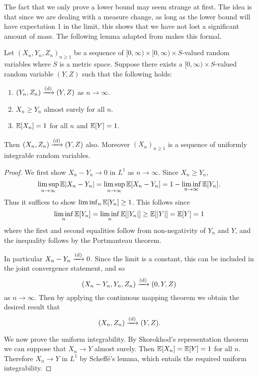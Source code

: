 The fact that we only prove a lower bound may seem strange at first. The idea is that since we are dealing with a measure change, as long as the lower bound will have expectation 1 in the limit, this shows that we have not lost a significant amount of mass. The following lemma adapted from \cite[Lemma 4.8]{conchon--kerjanStableGraphMetric2020} makes this formal.
\begin{lemma}
    \label{lem:sandwiching-lemma}
    Let $(X_n, Y_n, Z_n)_{n \geq 1}$ be a sequence of $[0, \infty) \times [0, \infty) \times S$-valued random variables where $S$ is a metric space. Suppose there exists a $[0, \infty) \times S$-valued random variable $(Y, Z)$ such that the following holds:
    \begin{enumerate}
        \item $(Y_n, Z_n) \xrightarrow[]{\mathrm{(d)}} (Y, Z)$ as $n \to \infty$.
        \item $X_n \geq Y_n$ almost surely for all $n$.
        \item ${\mathbb E}[X_n] = 1$ for all $n$ and ${\mathbb E}[Y] = 1$.
    \end{enumerate}
    Then $(X_n, Z_n) \xrightarrow[]{\mathrm{(d)}} (Y, Z)$ also. Moreover $(X_n)_{n \geq 1}$ is a sequence of uniformly integrable random variables.
\end{lemma}
\begin{proof}
    We first show $X_n - Y_n \to 0$ in $L^1$ as $n \to \infty$. Since $X_n \geq Y_n$,
    \begin{equation*}
        \limsup_{n \to \infty} {\mathbb E} \lvert X_n - Y_n\rvert
        = \limsup_{n \to \infty} {\mathbb E}[X_n - Y_n]
        = 1 - \liminf_{n \to \infty} {\mathbb E}[Y_n].
    \end{equation*}
    Thus it suffices to show $\liminf_n {\mathbb E}[Y_n] \geq 1$. This follows since
    \begin{equation*}
        \liminf_n {\mathbb E}[Y_n] =
        \liminf_n {\mathbb E}[\lvert Y_n\rvert] \geq
        {\mathbb E}[\lvert Y\rvert] =
        {\mathbb E}[Y] = 1
    \end{equation*}
    where the first and second equalities follow from non-negativity of $Y_n$ and $Y$, and the inequality follows by the Portmanteau theorem.

    In particular $X_n - Y_n \xrightarrow[]{\mathrm{(d)}} 0$. Since the limit is a constant, this can be included in the joint convergence statement, and so
    \begin{equation*}
        (X_n - Y_n, Y_n, Z_n) \xrightarrow[]{\mathrm{(d)}} (0, Y, Z)
    \end{equation*}
    as $n \to \infty$. Then by applying the continuous mapping theorem we obtain the desired result that
    \begin{equation*}
        (X_n, Z_n) \xrightarrow[]{\mathrm{(d)}} (Y, Z).
    \end{equation*}

    We now prove the uniform integrability. By Skorokhod's representation theorem we can suppose that $X_n \to Y$ almost surely. Then ${\mathbb E}[X_n] = {\mathbb E}[Y] = 1$ for all $n$. Therefore $X_n \to Y$ in $L^1$ by Scheffé's lemma, which entails the required uniform integrability.
\end{proof}

